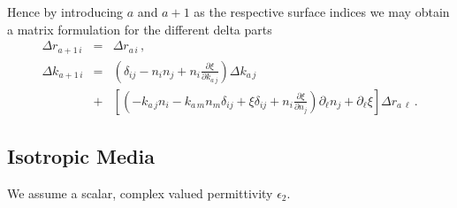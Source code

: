 \documentclass[12pt,a4paper,twoside,openright,BCOR10mm,headsepline,titlepage,abstracton,chapterprefix,final]{scrreprt}
\newcommand\wavenumber{k}
\newcommand\scalarpermittivity{\epsilon}
\begin{document}
Hence by introducing $a$ and $a+1$ as the respective surface indices we may obtain a matrix formulation for the different delta parts
\begin{eqnarray}
 \Delta r_{a+1\,i} &=& \Delta r_{a\,i}\,,\\
 \Delta \wavenumber_{a+1\,i} &=& 
   \left( \delta_{ij}  - n_i n_j + n_i \frac{\partial \xi}{\partial \wavenumber_{a\,j}}\right) \Delta\wavenumber_{a\,j} \nonumber\\
   &+&
   \left[
      \left(
     - \wavenumber_{a\,j}  n_i 
     - \wavenumber_{a\,m} n_m \delta_{ij}  
     + \xi \delta_{ij}
     + n_i \frac{\partial \xi}{\partial n_j}
    \right) \partial_\ell n_j + \partial_\ell \xi\right]\Delta r_{a\,\ell}\,.
\end{eqnarray}


\subsection{Isotropic Media}
We assume a scalar, complex valued permittivity $\scalarpermittivity_2$.
\end{document}
